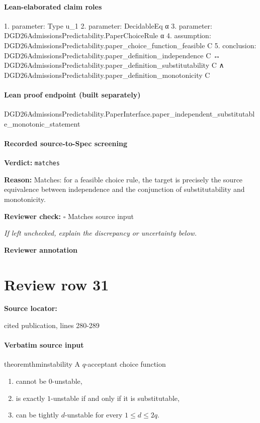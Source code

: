 \documentclass[10pt]{article}
\newcommand{\reviewerbox}{%
  \par\noindent\fbox{\parbox{0.96\linewidth}{\rule{0pt}{0.38in}}}\par
}
\newcommand{\reviewmatch}[1]{%
  \par\noindent\textbf{Reviewer check:} $\square$\; #1\par
  \noindent\emph{If left unchecked, explain the discrepancy or uncertainty below.}\par
}
\begin{document}
\paragraph{Lean-elaborated claim roles}\begin{ReviewVerbatim}
1. parameter: Type u_1
2. parameter: DecidableEq α
3. parameter: DGD26AdmissionsPredictability.PaperChoiceRule α
4. assumption: DGD26AdmissionsPredictability.paper_choice_function_feasible C
5. conclusion: DGD26AdmissionsPredictability.paper_definition_independence C ↔
  DGD26AdmissionsPredictability.paper_definition_substitutability C ∧
    DGD26AdmissionsPredictability.paper_definition_monotonicity C
\end{ReviewVerbatim}

\paragraph{Lean proof endpoint (built separately)}\begin{ReviewVerbatim}
DGD26AdmissionsPredictability.PaperInterface.paper_independent_substitutable_monotonic_statement
\end{ReviewVerbatim}

\paragraph{Recorded source-to-Spec screening}
\textbf{Verdict:} \texttt{matches}
\\
{\raggedright
\textbf{Reason:} Matches:\allowbreak{} for a feasible choice rule, the target is precisely the source equivalence between independence and the conjunction of substitutability and monotonicity.\allowbreak{}
\par}
\reviewmatch{Matches source input}
\noindent\textbf{Reviewer annotation}\par
\reviewerbox
\clearpage
\hypertarget{source-claim-dac748564d615cb6}{}
\section*{Review row 31}
\textbf{Source locator:} {\footnotesize\raggedright cited publication, lines 280-\allowbreak{}289\par}
\paragraph{Verbatim source input}
\begin{ReviewVerbatim}
\begin{restatable}{theorem}{thminstability}
\label{thm:instability}
A $q$-acceptant choice function
\begin{enumerate}
    \item cannot be $0$-unstable,
    \item  is exactly $1$-unstable if and only if it is substitutable,
    \item can be tightly $d$-unstable for every $1\leq d \leq 2q$.
\end{enumerate}

\end{restatable}%
\end{ReviewVerbatim}
\end{document}
